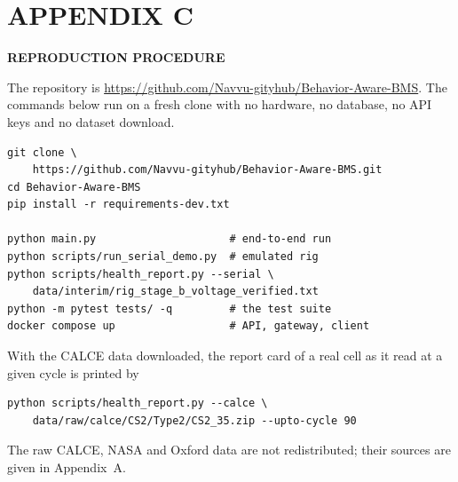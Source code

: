 \documentclass[12pt,a4paper]{amritareport}
\begin{document}
\chapter*{APPENDIX C}

\begin{center}
\textbf{REPRODUCTION PROCEDURE}
\end{center}

The repository is \url{https://github.com/Navvu-gityhub/Behavior-Aware-BMS}. The commands below run on a fresh clone with no hardware, no database, no API keys and no dataset download.

\begin{small}
\begin{verbatim}
git clone \
    https://github.com/Navvu-gityhub/Behavior-Aware-BMS.git
cd Behavior-Aware-BMS
pip install -r requirements-dev.txt

python main.py                     # end-to-end run
python scripts/run_serial_demo.py  # emulated rig
python scripts/health_report.py --serial \
    data/interim/rig_stage_b_voltage_verified.txt
python -m pytest tests/ -q         # the test suite
docker compose up                  # API, gateway, client
\end{verbatim}
\end{small}

With the CALCE data downloaded, the report card of a real cell as it read at a given cycle is printed by

\begin{small}
\begin{verbatim}
python scripts/health_report.py --calce \
    data/raw/calce/CS2/Type2/CS2_35.zip --upto-cycle 90
\end{verbatim}
\end{small}

The raw CALCE, NASA and Oxford data are not redistributed; their sources are given in Appendix~A.
\end{document}
